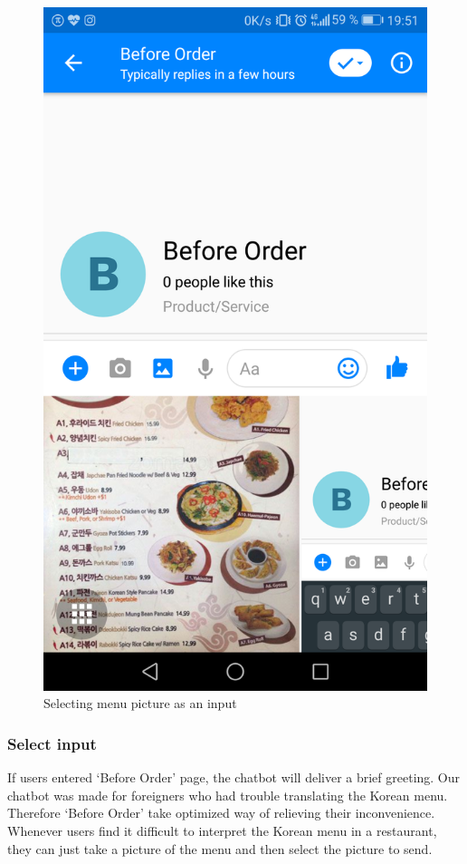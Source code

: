 \begin{figure}[htbp]
\centerline{\includegraphics[height=\custompicheight]{./pictures/facebook_input_selection}}
\caption{Selecting menu picture as an input}
\label{fig:Before Order_input_selection}
\end{figure}
\FloatBarrier
\subsubsection{Select input}
 If users entered ‘Before Order’ page, the chatbot will deliver a brief greeting. Our chatbot was made for foreigners who had trouble translating the Korean menu. Therefore ‘Before Order’ take optimized way of relieving their inconvenience. Whenever users find it difficult to interpret the Korean menu in a restaurant, they can just take a picture of the menu and then select the picture to send.


